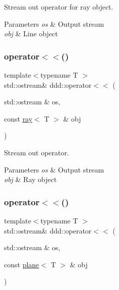 Stream out operator for ray object. 


\begin{DoxyParams}{Parameters}
{\em os} & Output stream \\
\hline
{\em obj} & Line object \\
\hline
\end{DoxyParams}
\mbox{\label{namespaceddd_ae2604d6c72853dfb2595f6882cbc7a51}} 
\subsubsection{\texorpdfstring{operator$<$$<$()}{operator<<()}\hspace{0.1cm}{\footnotesize\ttfamily [4/10]}}
{\footnotesize\ttfamily template$<$typename T $>$ \\
std\+::ostream\& ddd\+::operator$<$$<$ (\begin{DoxyParamCaption}\item[{std\+::ostream \&}]{os,  }\item[{const \hyperlink{classddd_1_1ray}{ray}$<$ T $>$ \&}]{obj }\end{DoxyParamCaption})\hspace{0.3cm}{\ttfamily [inline]}}



Stream out operator. 


\begin{DoxyParams}{Parameters}
{\em os} & Output stream \\
\hline
{\em obj} & Ray object \\
\hline
\end{DoxyParams}
\mbox{\label{namespaceddd_af1faa02295670c7cfd7f0278e3973f84}} 
\subsubsection{\texorpdfstring{operator$<$$<$()}{operator<<()}\hspace{0.1cm}{\footnotesize\ttfamily [5/10]}}
{\footnotesize\ttfamily template$<$typename T $>$ \\
std\+::ostream\& ddd\+::operator$<$$<$ (\begin{DoxyParamCaption}\item[{std\+::ostream \&}]{os,  }\item[{const \hyperlink{classddd_1_1plane}{plane}$<$ T $>$ \&}]{obj }\end{DoxyParamCaption})\hspace{0.3cm}{\ttfamily [inline]}}



